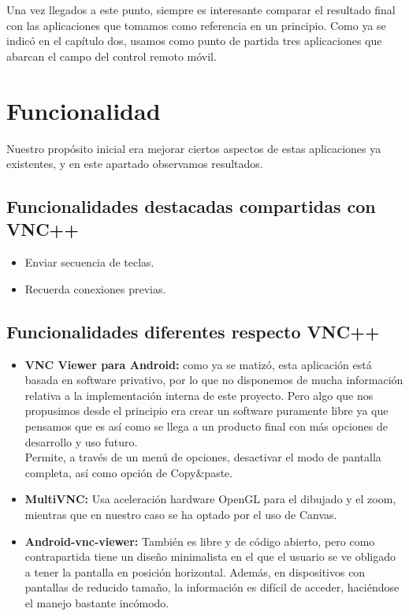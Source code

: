 Una vez llegados a este punto, siempre es interesante comparar el resultado final con las aplicaciones que tomamos como referencia en un principio. Como ya se indicó en el capítulo dos, usamos como punto de partida tres aplicaciones que abarcan el campo del control remoto móvil.\\

\section{Funcionalidad}

Nuestro propósito inicial era mejorar ciertos aspectos de estas aplicaciones ya existentes, y en este apartado observamos resultados.

\subsection{Funcionalidades destacadas compartidas con VNC++}
\begin{itemize}
\item Enviar secuencia de teclas.
\item Recuerda conexiones previas.
\end{itemize}
\subsection{Funcionalidades diferentes respecto VNC++}
\begin{itemize}
\item \textbf{VNC Viewer para Android:} como ya se matizó, esta aplicación está basada en software privativo, por lo que no disponemos de mucha información relativa a la implementación interna de este proyecto. Pero algo que nos propusimos desde el principio era crear un software puramente libre ya que pensamos que es así como se llega a un producto final con más opciones de desarrollo y uso futuro.\\

Permite, a través de un menú de opciones, desactivar el modo de pantalla completa, así como opción de Copy\&paste.
\item \textbf{MultiVNC:} Usa aceleración hardware OpenGL para el dibujado y el zoom, mientras que en nuestro caso se ha optado por el uso de Canvas.
\item \textbf{Android-vnc-viewer:} También es libre y de código abierto, pero como contrapartida tiene un diseño minimalista en el que el usuario se ve obligado a tener la pantalla en posición horizontal. Además, en dispositivos con pantallas de reducido tamaño, la información es difícil de acceder, haciéndose el manejo bastante incómodo.
\end{itemize}
